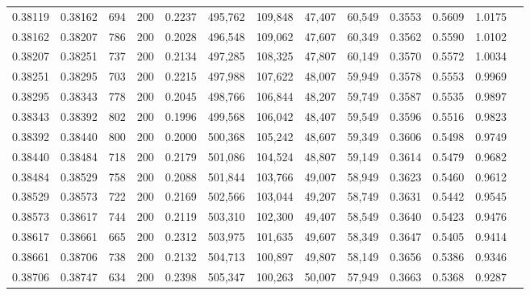\begin{tabular}{rrrrrrrrrrrrr}
0.38119 & 0.38162 &    694 & 200 &                                     0.2237 & 495,762 & 109,848 &  47,407 &  60,549 & 0.3553 & 0.5609 & 1.0175 \\
0.38162 & 0.38207 &    786 & 200 &                                     0.2028 & 496,548 & 109,062 &  47,607 &  60,349 & 0.3562 & 0.5590 & 1.0102 \\
0.38207 & 0.38251 &    737 & 200 &                                     0.2134 & 497,285 & 108,325 &  47,807 &  60,149 & 0.3570 & 0.5572 & 1.0034 \\
0.38251 & 0.38295 &    703 & 200 &                                     0.2215 & 497,988 & 107,622 &  48,007 &  59,949 & 0.3578 & 0.5553 & 0.9969 \\
0.38295 & 0.38343 &    778 & 200 &                                     0.2045 & 498,766 & 106,844 &  48,207 &  59,749 & 0.3587 & 0.5535 & 0.9897 \\
0.38343 & 0.38392 &    802 & 200 &                                     0.1996 & 499,568 & 106,042 &  48,407 &  59,549 & 0.3596 & 0.5516 & 0.9823 \\
0.38392 & 0.38440 &    800 & 200 &                                     0.2000 & 500,368 & 105,242 &  48,607 &  59,349 & 0.3606 & 0.5498 & 0.9749 \\
0.38440 & 0.38484 &    718 & 200 &                                     0.2179 & 501,086 & 104,524 &  48,807 &  59,149 & 0.3614 & 0.5479 & 0.9682 \\
0.38484 & 0.38529 &    758 & 200 &                                     0.2088 & 501,844 & 103,766 &  49,007 &  58,949 & 0.3623 & 0.5460 & 0.9612 \\
0.38529 & 0.38573 &    722 & 200 &                                     0.2169 & 502,566 & 103,044 &  49,207 &  58,749 & 0.3631 & 0.5442 & 0.9545 \\
0.38573 & 0.38617 &    744 & 200 &                                     0.2119 & 503,310 & 102,300 &  49,407 &  58,549 & 0.3640 & 0.5423 & 0.9476 \\
0.38617 & 0.38661 &    665 & 200 &                                     0.2312 & 503,975 & 101,635 &  49,607 &  58,349 & 0.3647 & 0.5405 & 0.9414 \\
0.38661 & 0.38706 &    738 & 200 &                                     0.2132 & 504,713 & 100,897 &  49,807 &  58,149 & 0.3656 & 0.5386 & 0.9346 \\
0.38706 & 0.38747 &    634 & 200 &                                     0.2398 & 505,347 & 100,263 &  50,007 &  57,949 & 0.3663 & 0.5368 & 0.9287 \\

\end{tabular}
